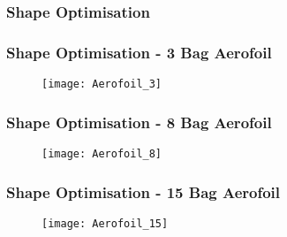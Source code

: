 \documentclass[serif, pdf]{beamer}
\begin{document}
\begin{frame}
\frametitle{Shape Optimisation}
\begin{figure}[h!]
\begin{subfigure}{.5\textwidth}
  \centering
  \label{fig:50_5_75_Numerical}
\end{subfigure}%
\begin{subfigure}{.5\textwidth}
  \centering
  \label{fig:50_9_Numerical}
\end{subfigure}
\begin{subfigure}{\textwidth}
  \centering
  \label{fig:50_15_Numerical}
\end{subfigure}
\label{fig:50_Numerical}
\end{figure}
\end{frame}


\begin{frame}
\frametitle{Shape Optimisation - 3 Bag Aerofoil}
\begin{figure}[h!]
  \texttt{[image: Aerofoil\_3]}
\end{figure}
\end{frame}


\begin{frame}
\frametitle{Shape Optimisation - 8 Bag Aerofoil}
\begin{figure}[h!]
  \texttt{[image: Aerofoil\_8]}
\end{figure}
\end{frame}


\begin{frame}
\frametitle{Shape Optimisation - 15 Bag Aerofoil}
\begin{figure}[h!]
  \texttt{[image: Aerofoil\_15]}
\end{figure}
\end{frame}
\end{document}

